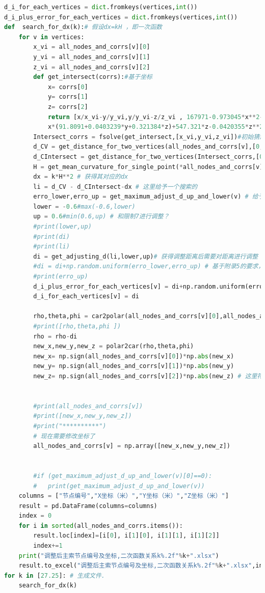 \documentclass[withoutpreface,bwprint]{cumcmthesis} %
\begin{document}
\begin{appendices}
\begin{lstlisting}[language=python]
d_i_for_each_vertices = dict.fromkeys(vertices,int())
d_i_plus_error_for_each_vertices = dict.fromkeys(vertices,int())
def  search_for_dx(k):# 假设dx=kH ，即一次函数
    for v in vertices:
        x_vi = all_nodes_and_corrs[v][0]
        y_vi = all_nodes_and_corrs[v][1]
        z_vi = all_nodes_and_corrs[v][2]
        def get_intersect(corrs):#基于坐标
            x= corrs[0]
            y= corrs[1]
            z= corrs[2]
            return [x/x_vi-y/y_vi,y/y_vi-z/z_vi , 167971-0.973045*x**2-0.984919*y**2+y*(68.671+0.240387*z)+
            x*(91.8091+0.0403239*y+0.321384*z)+547.321*z-0.0420355*z**2]
        Intersect_corrs = fsolve(get_intersect,[x_vi,y_vi,z_vi])#初始猜测值[0,-1]
        d_CV = get_distance_for_two_vertices(all_nodes_and_corrs[v],[0,0,0])
        d_CIntersect = get_distance_for_two_vertices(Intersect_corrs,[0,0,0])
        H = get_mean_curvature_for_single_point(*all_nodes_and_corrs[v]) # 获得其对应的曲率
        dx = k*H**2 # 获得其对应的dx 
        li = d_CV - d_CIntersect-dx # 这里给予一个搜索的 
        erro_lower,erro_up = get_maximum_adjust_d_up_and_lower(v) # 给予一个随机误差的范围
        lower = -0.6#max(-0.6,lower)
        up = 0.6#min(0.6,up) # 和限制7进行调整？
        #print(lower,up)
        #print(di)
        #print(li)
        di = get_adjusting_d(li,lower,up)# 获得调整距离后需要对距离进行调整
        #di = di+np.random.uniform(erro_lower,erro_up) # 基于附录5的要求，给予一个误差
        #print(erro_up)
        d_i_plus_error_for_each_vertices[v] = di+np.random.uniform(erro_lower,erro_up) 
        d_i_for_each_vertices[v] = di 
        
        rho,theta,phi = car2polar(all_nodes_and_corrs[v][0],all_nodes_and_corrs[v][1],all_nodes_and_corrs[v][2])
        #print([rho,theta,phi ])
        rho = rho-di
        new_x,new_y,new_z = polar2car(rho,theta,phi)
        new_x= np.sign(all_nodes_and_corrs[v][0])*np.abs(new_x)
        new_y= np.sign(all_nodes_and_corrs[v][1])*np.abs(new_y)
        new_z= np.sign(all_nodes_and_corrs[v][2])*np.abs(new_z) # 这里符号计算有点问题，但是小幅度的转换并不会影响到角度
        
        
        #print(all_nodes_and_corrs[v])
        #print([new_x,new_y,new_z])
        #print("**********")
        # 现在需要修改坐标了
        all_nodes_and_corrs[v] = np.array([new_x,new_y,new_z])
        
        
        #if (get_maximum_adjust_d_up_and_lower(v)[0]==0):
        #   print(get_maximum_adjust_d_up_and_lower(v))
    columns = ["节点编号","X坐标（米）","Y坐标（米）","Z坐标（米）"]
    result = pd.DataFrame(columns=columns)
    index = 0
    for i in sorted(all_nodes_and_corrs.items()):
        result.loc[index]=[i[0], i[1][0], i[1][1], i[1][2]]  
        index+=1
    print("调整后主索节点编号及坐标,二次函数关系k%.2f"%k+".xlsx")
    result.to_excel("调整后主索节点编号及坐标,二次函数关系k%.2f"%k+".xlsx",index=False)
for k in [27.25]: # 生成文件.
    search_for_dx(k)


\end{lstlisting}
\end{appendices}
\end{document}
